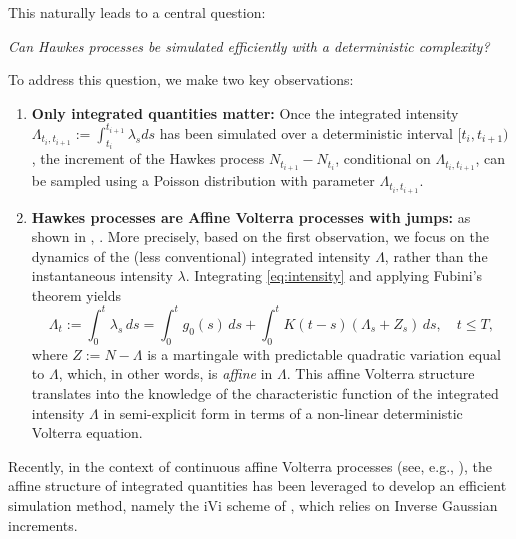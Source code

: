 \documentclass{article}
\newcommand{\1}{\mathbbm{1}}
\numberwithin{equation}{section}
\begin{document}
 This naturally leads to a central question:


\begin{center}
\textit{Can Hawkes processes be simulated efficiently with a deterministic complexity?}
\end{center}




To address this question, we make two key observations: 
\begin{enumerate}
    \item \textbf{Only integrated quantities matter:} Once the integrated intensity
$\Lambda_{t_i,t_{i+1}} := \int_{t_i}^{t_{i+1}} \lambda_s ds$
has been simulated over a deterministic interval \([t_i, t_{i+1})\), the increment of the Hawkes process 
$N_{t_{i+1}} - N_{t_i}$, conditional on $\Lambda_{t_i,t_{i+1}}$, can be sampled using a  Poisson distribution with parameter $\Lambda_{t_i,t_{i+1}}$.  
\item  \textbf{Hawkes processes are Affine Volterra processes with jumps:}  as shown in \citet[Example~2.3]{abi2021weak}, \citet*{pulido2024affine, cuchiero2019markovian}. More precisely, based on the first observation, we focus on the dynamics of the (less conventional) integrated intensity \(\Lambda\), rather than the instantaneous intensity \(\lambda\). Integrating \eqref{eq:intensity} and applying Fubini's theorem yields
\begin{equation}
\label{eq:integrated_intensity}
\Lambda_t := \int_0^t \lambda_s \, ds 
= \int_0^t g_0(s)\, ds + \int_0^t K(t-s) (\Lambda_s + Z_s) \, ds, \quad t \le T,
\end{equation}
where $ Z := N - \Lambda$ is a martingale with predictable quadratic variation equal to $\Lambda$, which, in other words, is \textit{affine} in $\Lambda$.  This affine Volterra structure translates into the knowledge of the characteristic function of the integrated intensity $\Lambda$ in semi-explicit form in terms of a non-linear deterministic Volterra equation. 
\end{enumerate}

Recently, in the context of continuous affine Volterra processes (see, e.g., \citet*{abi2019affine}), the affine structure of integrated quantities has been leveraged to develop an efficient simulation method, namely the iVi scheme of \citet{jaber2024simulation, jaber2025simulating}, which relies on Inverse Gaussian increments.
\end{document}
